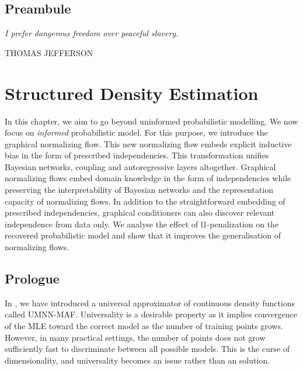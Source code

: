 \thispagestyle{empty}
\section*{Preambule}

\vfill

\vfill

{
\textit{\justify
   I prefer dangerous freedom over peaceful slavery.}

  \par\bigskip
  \raggedleft\MakeUppercase{Thomas Jefferson}
  \par%
}

\chapter{Structured Density Estimation}\label{ch:06}

\begin{chapter_outline}
  In this chapter, we aim to go beyond uninformed probabilistic modelling. We now focus on \textit{informed} probabilistic model.
  For this purpose, we introduce the graphical normalizing flow. This new normalizing flow embeds explicit inductive bias in the form of prescribed independencies. This transformation unifies Bayesian networks, coupling and autoregressive layers altogether. Graphical normalizing flows embed domain knowledge in the form of independencies while preserving the interpretability of Bayesian networks and the representation capacity of normalizing flows. In addition to the straightforward embedding of prescribed independencies, graphical conditioners can also discover relevant independence from data only. We analyse the effect of l1-penalization on the recovered probabilistic model and show that it improves the generalisation of normalizing flows.
\end{chapter_outline}

\section{Prologue}
In , we have introduced a universal approximator of continuous density functions called UMNN-MAF. Universality is a desirable property as it implies convergence of the MLE toward the correct model as the number of training points grows. However, in many practical settings, the number of points does not grow sufficiently fast to discriminate between all possible models. This is the curse of dimensionality, and universality becomes an issue rather than an solution.

